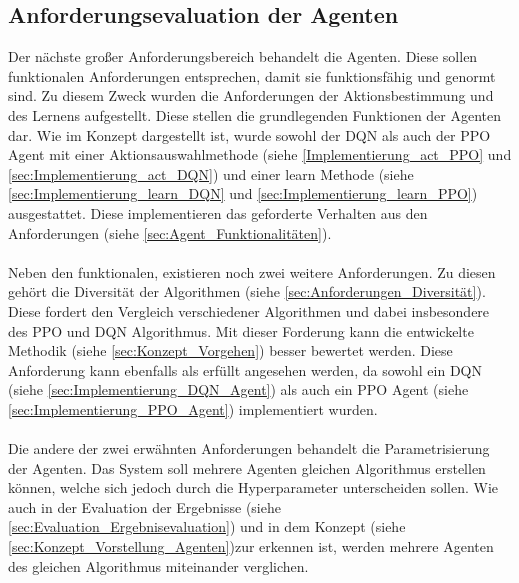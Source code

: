 \subsection{Anforderungsevaluation der Agenten}
Der nächste großer Anforderungsbereich behandelt die Agenten. Diese sollen funktionalen Anforderungen entsprechen, damit sie funktionsfähig und genormt sind. Zu diesem Zweck wurden die Anforderungen der Aktionsbestimmung und des Lernens aufgestellt. Diese stellen die grundlegenden Funktionen der Agenten dar. 
Wie im Konzept dargestellt ist, wurde sowohl der DQN als auch der PPO Agent mit einer Aktionsauswahlmethode (siehe \ref{Implementierung_act_PPO} und \ref{sec:Implementierung_act_DQN}) und einer learn Methode (siehe \ref{sec:Implementierung_learn_DQN} und \ref{sec:Implementierung_learn_PPO}) ausgestattet. Diese implementieren das geforderte Verhalten aus den Anforderungen (siehe \ref{sec:Agent_Funktionalitäten}).\\
\\Neben den funktionalen, existieren noch zwei weitere Anforderungen. Zu diesen gehört die Diversität der Algorithmen (siehe \ref{sec:Anforderungen_Diversität}).\\
Diese fordert den Vergleich verschiedener Algorithmen und dabei insbesondere des PPO und DQN Algorithmus. Mit dieser Forderung kann die entwickelte Methodik (siehe \ref{sec:Konzept_Vorgehen}) besser bewertet werden. Diese Anforderung kann ebenfalls als erfüllt angesehen werden, da sowohl ein DQN (siehe \ref{sec:Implementierung_DQN_Agent}) als auch ein PPO Agent (siehe \ref{sec:Implementierung_PPO_Agent}) implementiert wurden.\\
\\ Die andere der zwei erwähnten Anforderungen behandelt die Parametrisierung der Agenten. Das System soll mehrere Agenten gleichen Algorithmus erstellen können, welche sich jedoch durch die Hyperparameter unterscheiden sollen. Wie auch in der Evaluation der Ergebnisse (siehe \ref{sec:Evaluation_Ergebnisevaluation}) und in dem Konzept (siehe \ref{sec:Konzept_Vorstellung_Agenten})zur erkennen ist, werden mehrere Agenten des gleichen Algorithmus miteinander verglichen.

